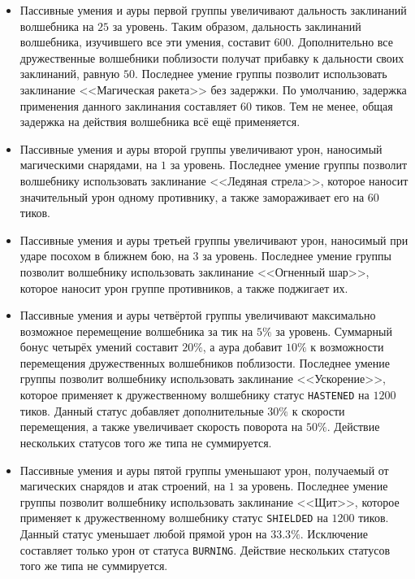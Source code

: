 \begin{itemize}
    \item Пассивные умения и ауры первой группы увеличивают дальность заклинаний волшебника на $25$ за уровень. Таким образом, дальность
          заклинаний волшебника, изучившего все эти умения, составит $600$. Дополнительно все дружественные волшебники поблизости получат
          прибавку к дальности своих заклинаний, равную $50$. Последнее умение группы позволит использовать заклинание <<Магическая ракета>>
          без задержки. По умолчанию, задержка применения данного заклинания составляет $60$ тиков. Тем не менее, общая задержка на действия
          волшебника всё ещё применяется.
    \item Пассивные умения и ауры второй группы увеличивают урон, наносимый магическими снарядами, на $1$ за уровень. Последнее умение
          группы позволит волшебнику использовать заклинание <<Ледяная стрела>>, которое наносит значительный урон одному противнику, а
          также замораживает его на $60$ тиков.
    \item Пассивные умения и ауры третьей группы увеличивают урон, наносимый при ударе посохом в ближнем бою, на $3$ за уровень. Последнее
          умение группы позволит волшебнику использовать заклинание <<Огненный шар>>, которое наносит урон группе противников, а также
          поджигает их.
    \item Пассивные умения и ауры четвёртой группы увеличивают максимально возможное перемещение волшебника за тик на $5\%$ за уровень.
          Суммарный бонус четырёх умений составит $20\%$, а аура добавит $10\%$ к возможности перемещения дружественных волшебников
          поблизости. Последнее умение группы позволит волшебнику использовать заклинание <<Ускорение>>, которое применяет к дружественному
          волшебнику статус \texttt{HASTENED} на $1200$ тиков. Данный статус добавляет дополнительные $30\%$ к скорости перемещения, а также
          увеличивает скорость поворота на $50\%$. Действие нескольких статусов того же типа не суммируется.
    \item Пассивные умения и ауры пятой группы уменьшают урон, получаемый от магических снарядов и атак строений, на $1$ за уровень.
          Последнее умение группы позволит волшебнику использовать заклинание <<Щит>>, которое применяет к дружественному волшебнику статус
          \texttt{SHIELDED} на $1200$ тиков. Данный статус уменьшает любой прямой урон на $33.3\%$. Исключение составляет только урон от
          статуса \texttt{BURNING}. Действие нескольких статусов того же типа не суммируется.
\end{itemize}

